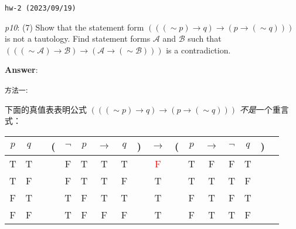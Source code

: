 \documentclass[UTF8,12pt,a4paper]{ctexart}
\newcommand{\negs}{\sim\!}
\begin{document}
\noindent\texttt{hw-2 (2023/09/19)}

\emph{p10}: (7) \quad
Show that the statement form $(((\negs p) \to q)  \to (p \to (\negs q)))$ 
is not a tautology. Find statement forms $\mathscr{A}$ and $\mathscr{B}$ such that 
$(((\negs \mathscr{A}) \to \mathscr{B})  \to (\mathscr{A} \to (\negs \mathscr{B})))$ is a contradiction.

\noindent\textbf{Answer}:

\noindent \texttt{方法一}:

下面的真值表表明公式
 $(((\negs p) \to q)  \to (p \to (\negs q)))$ 
\textit{不是}一个重言式：
\begin{center}
	\hspace{8em} 
	\begin{tabular}{@{ }c@{ }@{ }c | c@{ }@{}c@{}@{ }c@{ }@{ }c@{ }@{ }c@{ }@{ }c@{ }@{}c@{}@{ }c@{ }@{}c@{}@{ }c@{ }@{ }c@{ }@{ }c@{ }@{ }c@{ }@{}c@{}@{ }c}
		$p$ & $q$ &  & ( & $\lnot$ & $p$ & $\rightarrow$ & $q$ & ) & $\rightarrow$ & ( & $p$ & $\rightarrow$ & $\lnot$ & $q$ & ) & \\
		\hline 
		T & T &  &  & F & T & T & T &  & \textcolor{red}{F} &  & T & F & F & T &  & \\
		T & F &  &  & F & T & T & F &  & {T} &  & T & T & T & F &  & \\
		F & T &  &  & T & F & T & T &  & {T} &  & F & T & F & T &  & \\
		F & F &  &  & T & F & F & F &  & {T} &  & F & T & T & F &  & \\
	\end{tabular}
\end{center}
\end{document}
